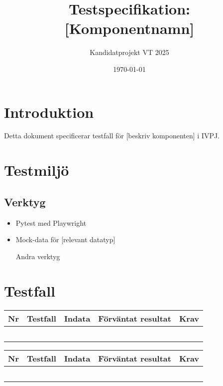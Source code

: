 \documentclass{article}
\begin{document}
\title{Testspecifikation: [Komponentnamn]}
\author{Kandidatprojekt VT 2025}
\date{\today}

\maketitle

\section{Introduktion}
Detta dokument specificerar testfall för [beskriv komponenten] i IVPJ.

\section{Testmiljö}
\subsection{Verktyg}
\begin{itemize}
    \item Pytest med Playwright
    \item Mock-data för [relevant datatyp]
    \item [Andra verktyg]
\end{itemize}

\section{Testfall}

\begin{longtable}{|L{1.5cm}|L{3.2cm}|L{4.5cm}|L{4.5cm}|L{2.2cm}|}
\hline
\textbf{Nr} & \textbf{Testfall} & \textbf{Indata} & \textbf{Förväntat resultat} & \textbf{Krav} \\
\hline
 &  &  &  &  \\
\hline
 &  &  &  &  \\
\hline
 &  &  &  &  \\
\hline
 &  &  &  &  \\
\hline
 &  &  &  &  \\
\hline
\end{longtable}

\begin{longtable}{|L{1.5cm}|L{3.2cm}|L{4.5cm}|L{4.5cm}|L{2.2cm}|}
\hline
\textbf{Nr} & \textbf{Testfall} & \textbf{Indata} & \textbf{Förväntat resultat} & \textbf{Krav} \\
\hline
 &  &  &  &  \\
\hline
 &  &  &  &  \\
\hline
 &  &  &  &  \\
\hline
 &  &  &  &  \\
\hline
 &  &  &  &  \\
\hline
\end{longtable}
\end{document}
